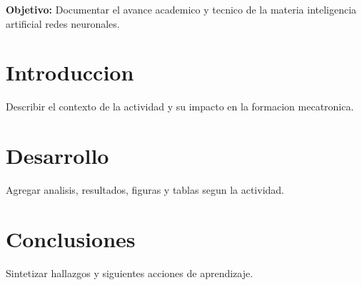 \documentclass[spanish,letterpaper,oneside]{article}
\begin{document}
\templatePortrait
\templatePagecfg
\onehalfspacing

\begin{abstractd}
\textbf{Objetivo:} Documentar el avance academico y tecnico de la materia inteligencia artificial redes neuronales.
\end{abstractd}

\templateIndex
\templateFinalcfg

\section{Introduccion}
Describir el contexto de la actividad y su impacto en la formacion mecatronica.

\section{Desarrollo}
Agregar analisis, resultados, figuras y tablas segun la actividad.

\section{Conclusiones}
Sintetizar hallazgos y siguientes acciones de aprendizaje.



\end{document}
